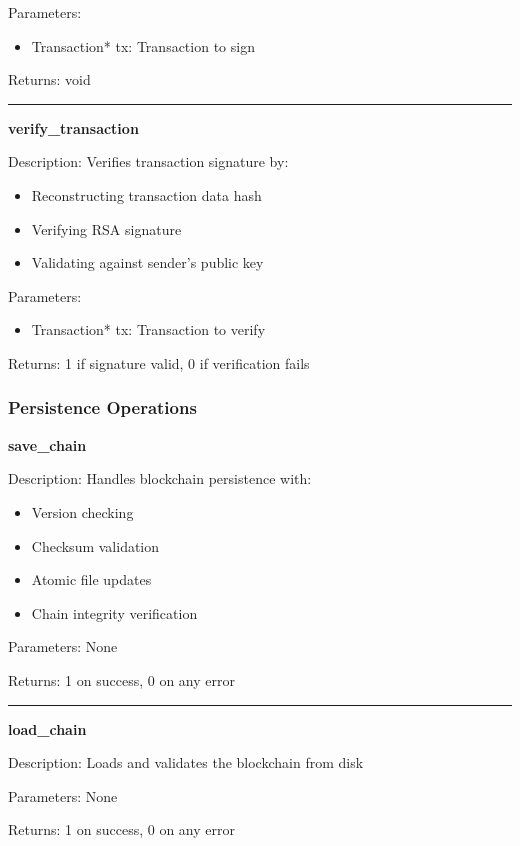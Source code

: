 \documentclass[12pt]{article}
\begin{document}
Parameters:
\begin{itemize}
\item Transaction* tx: Transaction to sign
\end{itemize}

Returns: void

\vspace{1em}
\hrule
\vspace{1em}

\textbf{verify\_transaction}

Description: Verifies transaction signature by:
\begin{itemize}
\item Reconstructing transaction data hash
\item Verifying RSA signature
\item Validating against sender's public key
\end{itemize}

Parameters:
\begin{itemize}
\item Transaction* tx: Transaction to verify
\end{itemize}

Returns: 1 if signature valid, 0 if verification fails

\subsubsection{Persistence Operations}
\textbf{save\_chain}

Description: Handles blockchain persistence with:
\begin{itemize}
\item Version checking
\item Checksum validation
\item Atomic file updates
\item Chain integrity verification
\end{itemize}

Parameters: None

Returns: 1 on success, 0 on any error

\vspace{1em}
\hrule
\vspace{1em}

\textbf{load\_chain}

Description: Loads and validates the blockchain from disk

Parameters: None

Returns: 1 on success, 0 on any error
\end{document}
